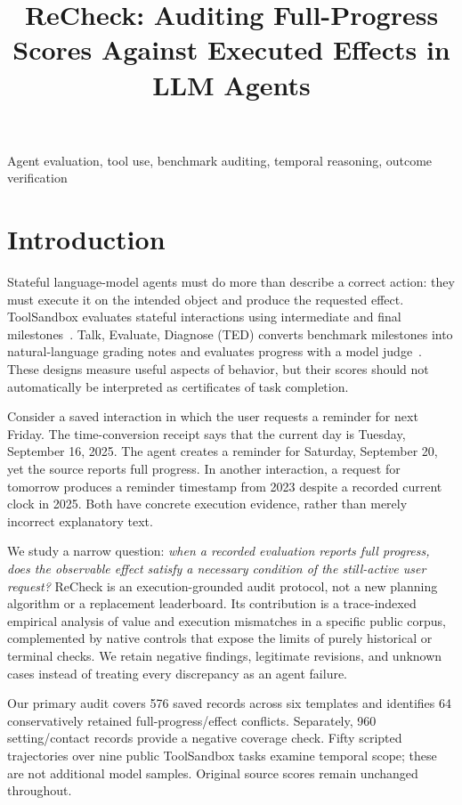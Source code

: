 \documentclass[10pt,letterpaper]{article}
\title{ReCheck: Auditing Full-Progress Scores Against Executed Effects in LLM Agents}
\begin{document}
\maketitle
\begin{abstract}

\end{abstract}
\begin{keywords}
Agent evaluation, tool use, benchmark auditing, temporal reasoning, outcome verification
\end{keywords}

\section{Introduction}
\label{sec:intro}
Stateful language-model agents must do more than describe a correct action: they must execute it on the intended object and produce the requested effect. ToolSandbox evaluates stateful interactions using intermediate and final milestones~\cite{toolsandbox}. Talk, Evaluate, Diagnose (TED) converts benchmark milestones into natural-language grading notes and evaluates progress with a model judge~\cite{ted}. These designs measure useful aspects of behavior, but their scores should not automatically be interpreted as certificates of task completion.

Consider a saved interaction in which the user requests a reminder for next Friday. The time-conversion receipt says that the current day is Tuesday, September 16, 2025. The agent creates a reminder for Saturday, September 20, yet the source reports full progress. In another interaction, a request for tomorrow produces a reminder timestamp from 2023 despite a recorded current clock in 2025. Both have concrete execution evidence, rather than merely incorrect explanatory text.

We study a narrow question: \emph{when a recorded evaluation reports full progress, does the observable effect satisfy a necessary condition of the still-active user request?} ReCheck is an execution-grounded audit protocol, not a new planning algorithm or a replacement leaderboard. Its contribution is a trace-indexed empirical analysis of value and execution mismatches in a specific public corpus, complemented by native controls that expose the limits of purely historical or terminal checks. We retain negative findings, legitimate revisions, and unknown cases instead of treating every discrepancy as an agent failure.

Our primary audit covers 576 saved records across six templates and identifies 64 conservatively retained full-progress/effect conflicts. Separately, 960 setting/contact records provide a negative coverage check. Fifty scripted trajectories over nine public ToolSandbox tasks examine temporal scope; these are not additional model samples. Original source scores remain unchanged throughout.
\end{document}
